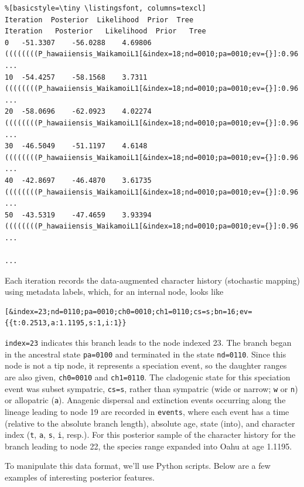 \begin{framed}
\begin{lstlisting}%[basicstyle=\tiny \listingsfont, columns=texcl]
Iteration  Posterior  Likelihood  Prior  Tree
Iteration	Posterior	Likelihood	Prior	Tree
0	-51.3307	-56.0288	4.69806	((((((((P_hawaiiensis_WaikamoiL1[&index=18;nd=0010;pa=0010;ev={}]:0.96 ...
10	-54.4257	-58.1568	3.7311	((((((((P_hawaiiensis_WaikamoiL1[&index=18;nd=0010;pa=0010;ev={}]:0.96 ...
20	-58.0696	-62.0923	4.02274	((((((((P_hawaiiensis_WaikamoiL1[&index=18;nd=0010;pa=0010;ev={}]:0.96 ...
30	-46.5049	-51.1197	4.6148	((((((((P_hawaiiensis_WaikamoiL1[&index=18;nd=0010;pa=0010;ev={}]:0.96 ...
40	-42.8697	-46.4870	3.61735	((((((((P_hawaiiensis_WaikamoiL1[&index=18;nd=0010;pa=0010;ev={}]:0.96 ...
50	-43.5319	-47.4659	3.93394	((((((((P_hawaiiensis_WaikamoiL1[&index=18;nd=0010;pa=0010;ev={}]:0.96 ...

...
\end{lstlisting}
\end{framed}

Each iteration records the data-augmented character history (stochastic mapping) using metadata labels, which, for an internal node, looks like

\begin{snugshade}
\begin{lstlisting}
[&index=23;nd=0110;pa=0010;ch0=0010;ch1=0110;cs=s;bn=16;ev={{t:0.2513,a:1.1195,s:1,i:1}}
\end{lstlisting}
\end{snugshade}

{\tt index=23} indicates this branch leads to the node indexed 23.
The branch began in the ancestral state {\tt pa=0100} and terminated in the state {\tt nd=0110}.
Since this node is not a tip node, it represents a speciation event, so the daughter ranges are also given, {\tt ch0=0010} and {\tt ch1=0110}.
The cladogenic state for this speciation event was subset sympatric, {\tt cs=s}, rather than sympatric (wide or narrow; {\tt w} or  {\tt n}) or allopatric ({\tt a}).
Anagenic dispersal and extinction events occurring along the lineage leading to node 19 are recorded in {\tt events}, where each event has a time (relative to the absolute branch length), absolute age, state (into), and character index ({\tt t}, {\tt a}, {\tt s}, {\tt i}, resp.).
For this posterior sample of the character history for the branch leading to node 22, the species range expanded into Oahu at age 1.1195.

To manipulate this data format, we'll use Python scripts. Below are a few examples of interesting posterior features.

